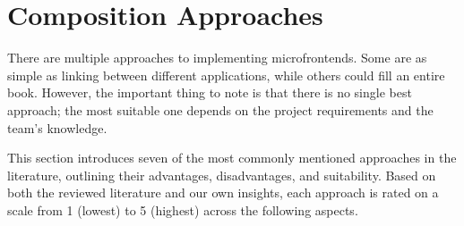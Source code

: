 \section{Composition Approaches}
There are multiple approaches to implementing microfrontends. Some are as simple as linking between different applications, while others could fill an entire book. However, the important thing to note is that there is no single best approach; the most suitable one depends on the project requirements and the team's knowledge.

This section introduces seven of the most commonly mentioned approaches in the literature, outlining their advantages, disadvantages, and suitability. Based on both the reviewed literature and our own insights, each approach is rated on a scale from 1 (lowest) to 5 (highest) across the following aspects.
